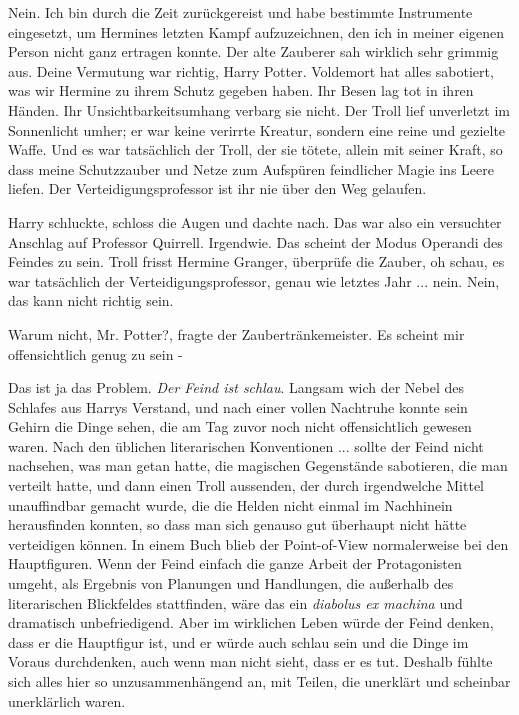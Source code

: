 \glqq{}Nein. Ich bin durch die Zeit zurückgereist und habe bestimmte Instrumente
eingesetzt, um Hermines letzten Kampf aufzuzeichnen, den ich in meiner eigenen
Person nicht ganz ertragen konnte.\grqq{} Der alte Zauberer sah wirklich sehr
grimmig aus. \glqq{}Deine Vermutung war richtig, Harry Potter. Voldemort hat
alles sabotiert, was wir Hermine zu ihrem Schutz gegeben haben. Ihr Besen lag
tot in ihren Händen. Ihr Unsichtbarkeitsumhang verbarg sie nicht. Der Troll lief
unverletzt im Sonnenlicht umher; er war keine verirrte Kreatur, sondern eine
reine und gezielte Waffe. Und es war tatsächlich der Troll, der sie tötete,
allein mit seiner Kraft, so dass meine Schutzzauber und Netze zum Aufspüren
feindlicher Magie ins Leere liefen. Der Verteidigungsprofessor ist ihr nie über
den Weg gelaufen.\grqq{}

Harry schluckte, schloss die Augen und dachte nach. \glqq{}Das war also ein
versuchter Anschlag auf Professor Quirrell. Irgendwie. Das scheint der Modus
Operandi des Feindes zu sein. Troll frisst Hermine Granger, überprüfe die
Zauber, oh schau, es war tatsächlich der Verteidigungsprofessor, genau wie
letztes Jahr ... nein. Nein, das kann nicht richtig sein.\grqq{}

\glqq{}Warum nicht, Mr. Potter?\grqq{}, fragte der Zaubertränkemeister. \glqq{}Es
scheint mir offensichtlich genug zu sein -\grqq{}

\glqq{}Das ist ja das Problem.\grqq{} \emph{Der Feind ist schlau}. Langsam wich
der Nebel des Schlafes aus Harrys Verstand, und nach einer vollen Nachtruhe
konnte sein Gehirn die Dinge sehen, die am Tag zuvor noch nicht offensichtlich
gewesen waren. Nach den üblichen literarischen Konventionen ... sollte der Feind
nicht nachsehen, was man getan hatte, die magischen Gegenstände sabotieren, die
man verteilt hatte, und dann einen Troll aussenden, der durch irgendwelche
Mittel unauffindbar gemacht wurde, die die Helden nicht einmal im Nachhinein
herausfinden konnten, so dass man sich genauso gut überhaupt nicht hätte
verteidigen können. In einem Buch blieb der Point-of-View normalerweise bei den
Hauptfiguren. Wenn der Feind einfach die ganze Arbeit der Protagonisten umgeht,
als Ergebnis von Planungen und Handlungen, die außerhalb des literarischen
Blickfeldes stattfinden, wäre das ein \emph{diabolus ex machina} und dramatisch
unbefriedigend. Aber im wirklichen Leben würde der Feind denken, dass er die
Hauptfigur ist, und er würde auch schlau sein und die Dinge im Voraus
durchdenken, auch wenn man nicht sieht, dass er es tut. Deshalb fühlte sich
alles hier so unzusammenhängend an, mit Teilen, die unerklärt und scheinbar
unerklärlich waren.

